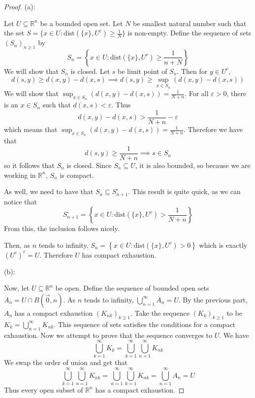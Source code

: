 \documentclass{article}
\theoremstyle{plain} %
\numberwithin{thm}{section} %
\theoremstyle{definition}
\begin{document}
        \begin{proof}
            (a):
            
            Let \(U \subseteq \mathbb{R}^n\) be a bounded open set. Let \(N\) be smallest natural number such that the set \(S = \{x \in U : \mathrm{dist}(\{x\}, U^c) \geq \frac{1}{N}\}\) is non-empty. Define the sequence of sets \((S_n)_{n\geq 1}\) by
            \[
                S_n = \left\{x \in U : \mathrm{dist}(\{x\}, U^c) \geq \frac{1}{n+N}\right\}
            \]
            We will show that \(S_n\) is closed. Let \(s\) be limit point of \(S_n\). Then for \(y \in U^c\),
            \[
                d(s,y) \geq d(x,y) - d(x,s) \implies d(s,y) \geq \sup _{x \in S_n} \left(d(x,y) - d(x,s)\right)
            \]
            We will show that \(\sup _{x \in S_n} \left(d(x,y) - d(x,s)\right) = \frac{1}{N+n}\). For all \(\varepsilon > 0\), there is an \(x \in S_n\) such that \(d(x,s) < \varepsilon\). Thus
            \[
                d(x,y) - d(x,s) > \frac{1}{N+n} - \varepsilon
            \]
            which means that \(\sup _{x \in S_n} \left(d(x,y) - d(x,s)\right) = \frac{1}{N+n}\). Therefore we have that
            \[
                d(s,y) \geq \frac{1}{N+n} \implies s \in S_n
            \]
            so it follows that \(S_n\) is closed. Since \(S_n \subseteq U\), it is also bounded, so because we are working in \(\mathbb{R}^n\), \(S_n\) is compact.

            As well, we need to have that \(S_n \subseteq S_{n+1}^{\circ}\). This result is quite quick, as we can notice that
            \[
                S_{n+1}^\circ = \left\{x \in U : \mathrm{dist}(\{x\}, U^c) > \frac{1}{N+n}\right\}
            \]
            From this, the inclusion follows nicely.

            Then, as \(n\) tends to infinity, \(S_n = \left\{x \in U : \mathrm{dist}(\{x\}, U^c) > 0\right\}\) which is exactly \((U^c)^c = U\). Therefore \(U\) has compact exhaustion.

            (b):

            Now, let \(U \subseteq \mathbb{R}^n\) be open. Define the sequence of bounded open sets \(A_n = U \cap B(\vec{0},  n)\). As \(n\) tends to infinity, \(\bigcup_{n=1}^{\infty} A_n = U\). By the previous part, \(A_n\) has a compact exhaustion \((K_{nk})_{k\geq 1}\). Take the sequence \((K_k)_{k\geq 1}\) to be \(K_k = \bigcup_{n=1}^{\infty} K_{nk}\). This sequence of sets satisfies the conditions for a compact exhaustion. Now we attempt to prove that the sequence converges to \(U\). We have
            \[
                \bigcup_{k=1}^{\infty} K_k = \bigcup_{k=1}^{\infty} \bigcup_{n=1}^{\infty} K_{nk}
            \]
            We swap the order of union and get that
            \[
                \bigcup_{k=1}^{\infty} \bigcup_{n=1}^{\infty} K_{nk} = \bigcup_{n=1}^{\infty} \bigcup_{k=1}^{\infty} K_{nk} = \bigcup_{n=1}^{\infty} A_n = U
            \]
            Thus every open subset of \(\mathbb{R}^n\) has a compact exhaustion.
        \end{proof}
\end{document}
